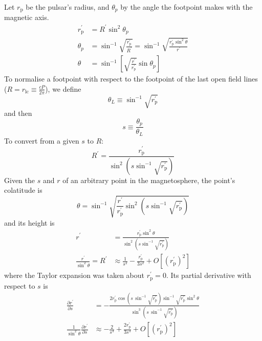 \documentclass{book}
\newcommand{\pd}[2]{\frac{\partial {#1}}{\partial {#2}}}
\newcommand{\rL}{r_\text{lc}} %
\newcommand{\rp}{r_\text{p}} %
\begin{document}
Let $\rp$ be the pulsar's radius, and $\theta_p$ by the angle the footpoint makes with the magnetic axis.
\begin{align}
    \rp^\prime &= R^\prime\sin^2\theta_p \\
    \theta_p &= \sin^{-1}\sqrt{\frac{\rp^\prime}{R^\prime}} = \sin^{-1}\sqrt{\frac{\rp^\prime\sin^2\theta}{r^\prime}} \\
    \theta   &= \sin^{-1}\left[\sqrt{\frac{r^\prime}{\rp^\prime}}\sin\theta_p\right] \label{eqn:thp_to_th}
\end{align}
To normalise a footpoint with respect to the footpoint of the last open field lines ($R = \rL \equiv \frac{cP}{2\pi}$), we define
\begin{equation}
    \theta_L \equiv \sin^{-1}\sqrt{\rp^\prime}
\end{equation}
and then
\begin{equation}
    s \equiv \frac{\theta_p}{\theta_L}
\end{equation}
To convert from a given $s$ to $R$:
\begin{equation}
    R^\prime = \frac{\rp^\prime}{\sin^2\left(s\sin^{-1}\sqrt{\rp^\prime}\right)}
\end{equation}
Given the $s$ and $r$ of an arbitrary point in the magnetosphere, the point's colatitude is
\begin{equation}
    \theta = \sin^{-1}\sqrt{\frac{r^\prime}{\rp^\prime}\sin^2\left(s \sin^{-1}\sqrt{\rp^\prime}\right)}
\end{equation}
and its height is
\begin{equation}
    \begin{aligned}
        r^\prime &= \frac{\rp^\prime\sin^2\theta}{\sin^2\left(s \sin^{-1}\sqrt{\rp^\prime}\right)} \\
        \frac{r^\prime}{\sin^2\theta} = R^\prime &\approx \frac{1}{s^2} - \frac{\rp^\prime}{3s^2} + O\left[(\rp^\prime)^2\right]
    \end{aligned}
\end{equation}
where the Taylor expansion was taken about $\rp^\prime = 0$.
Its partial derivative with respect to $s$ is
\begin{equation}
    \begin{aligned}
        \pd{r^\prime}{s} &= -\frac{2\rp^\prime \cos\left(s\,\sin^{-1}\sqrt{\rp^\prime}\right) \sin^{-1}\sqrt{\rp^\prime} \sin^2\theta}{
                                   \sin^3\left(s\,\sin^{-1}\sqrt{\rp^\prime}\right)} \\
        \frac{1}{\sin^2\theta} \pd{r^\prime}{s} &\approx -\frac{2}{s^3} + \frac{2\rp^\prime}{3s^3} + O\left[\left(\rp^\prime\right)^2\right]
    \end{aligned}
\end{equation}
\end{document}
